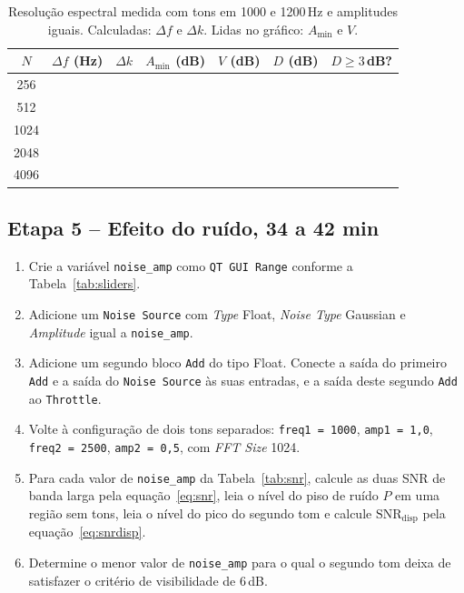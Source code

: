 \documentclass[11pt,a4paper]{article}
\begin{document}
\begin{table}[H]
  \centering
  \setlength{\tabcolsep}{4.5pt}
  \begin{tabular}{c c c c c c c}
    \toprule
    \textbf{$N$} & \textbf{$\Delta f$ (Hz)} & \textbf{$\Delta k$} &
      \textbf{$A_{\min}$ (dB)} & \textbf{$V$ (dB)} &
      \textbf{$D$ (dB)} & \textbf{$D \geq 3$\,dB?} \\
    \midrule
    256   &  &  &  &  &  &  \\
    512   &  &  &  &  &  &  \\
    1024  &  &  &  &  &  &  \\
    2048  &  &  &  &  &  &  \\
    4096  &  &  &  &  &  &  \\
    \bottomrule
  \end{tabular}
  \caption{Resolução espectral medida com tons em 1000 e 1200\,Hz e
    amplitudes iguais. Calculadas: $\Delta f$ e $\Delta k$. Lidas no
    gráfico: $A_{\min}$ e $V$.}
  \label{tab:fftsizes}
\end{table}

\subsection*{Etapa 5 -- Efeito do ruído, 34 a 42 min}

\begin{instrucao}
\begin{enumerate}[label=\arabic*.]
  \item Crie a variável \texttt{noise\_amp} como \texttt{QT GUI Range}
    conforme a Tabela~\ref{tab:sliders}.
  \item Adicione um \texttt{Noise Source} com \textit{Type} Float,
    \textit{Noise Type} Gaussian e \textit{Amplitude} igual a
    \texttt{noise\_amp}.
  \item Adicione um segundo bloco \texttt{Add} do tipo Float. Conecte a saída
    do primeiro \texttt{Add} e a saída do \texttt{Noise Source} às suas
    entradas, e a saída deste segundo \texttt{Add} ao \texttt{Throttle}.
  \item Volte à configuração de dois tons separados:
    \texttt{freq1 = 1000}, \texttt{amp1 = 1{,}0}, \texttt{freq2 = 2500},
    \texttt{amp2 = 0{,}5}, com \textit{FFT Size} 1024.
  \item Para cada valor de \texttt{noise\_amp} da Tabela~\ref{tab:snr},
    calcule as duas SNR de banda larga pela equação~\eqref{eq:snr}, leia o
    nível do piso de ruído $P$ em uma região sem tons, leia o nível do pico
    do segundo tom e calcule $\mathrm{SNR}_{\mathrm{disp}}$ pela
    equação~\eqref{eq:snrdisp}.
  \item Determine o menor valor de \texttt{noise\_amp} para o qual o segundo
    tom deixa de satisfazer o critério de visibilidade de 6\,dB.
\end{enumerate}
\end{instrucao}
\end{document}
